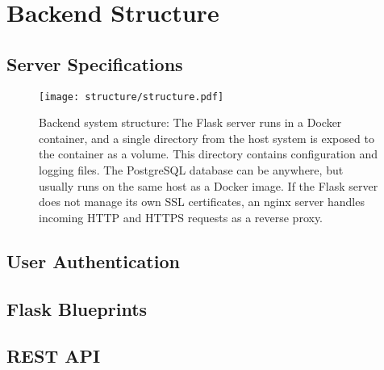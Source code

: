 \chapter{Backend Structure}


\section{Server Specifications}

\begin{figure}[tb]
  \centering
  \texttt{[image: structure/structure.pdf]}
  \caption{Backend system structure: The Flask server runs in a Docker container, and a single directory from the host system is exposed to the container as a volume. This directory contains configuration and logging files. The PostgreSQL database can be anywhere, but usually runs on the same host as a Docker image. If the Flask server does not manage its own SSL certificates, an nginx server handles incoming HTTP and HTTPS requests as a reverse proxy.}
  \label{fig:structure}
\end{figure}


\section{User Authentication}


\section{Flask Blueprints}


\section{REST API}
\label{sec:rest-api}

